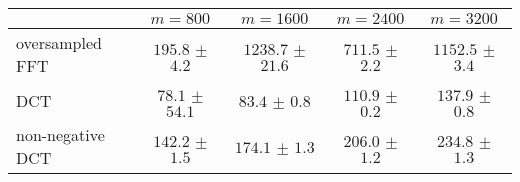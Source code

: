 \centering
\renewcommand{\arraystretch}{1.2}
\begin{tabular}{@{}lcccc@{}}
\toprule
 & $m=800$ & $m=1600$ & $m=2400$ & $m=3200$\\
\midrule
oversampled FFT & $195.8$ $\pm$ $4.2$ & $1238.7$ $\pm$ $21.6$ & $711.5$ $\pm$ $2.2$ & $1152.5$ $\pm$ $3.4$ \\
DCT & $78.1$ $\pm$ $54.1$ & $83.4$ $\pm$ $0.8$ & $110.9$ $\pm$ $0.2$ & $137.9$ $\pm$ $0.8$ \\
non-negative DCT & $142.2$ $\pm$ $1.5$ & $174.1$ $\pm$ $1.3$ & $206.0$ $\pm$ $1.2$ & $234.8$ $\pm$ $1.3$ \\
\bottomrule
\end{tabular}
